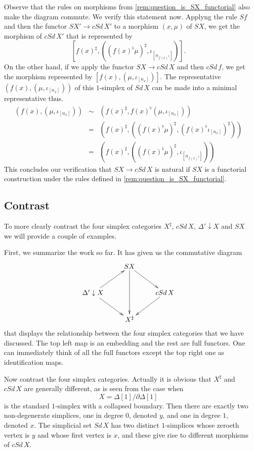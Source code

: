 \begin{remark}
Observe that the rules on morphisms from \cref{rem:question_is_SX_functorial} also make the diagram commute. We verify this statement now. Applyng the rule $Sf$ and then the functor $SX'\to cSd\, X'$ to a morphism $(x,\mu )$ of $SX$, we get the morphism of $cSd\, X'$ that is represented by
\[[f(x)^\sharp ,((f(x)^\flat \mu )^\sharp ,\iota _{[n_{f(x)^\sharp }]})].\]
On the other hand, if we apply the functor $SX\to cSd\, X$ and then $cSd\, f$, we get the morphism represented by $[f(x),(\mu ,\iota _{[n_x]})]$. The representative $(f(x),(\mu ,\iota _{[n_x]}))$ of this $1$-simplex of $Sd\, X$ can be made into a minimal representative thus.
\begin{displaymath}
\begin{array}{rcl}
(f(x),(\mu ,\iota _{[n_x]})) & \sim & (f(x)^\sharp ,f(x)^\flat (\mu ,\iota _{[n_x]})) \\
& = & (f(x)^\sharp ,((f(x)^\flat \mu )^\sharp ,(f(x)^\flat\iota _{[n_x]})^\sharp )) \\
& = & (f(x)^\sharp ,((f(x)^\flat \mu )^\sharp ,\iota _{[n_{f(x)^\sharp }]}))
\end{array}
\end{displaymath}
This concludes our verification that $SX\to cSd\, X$ is natural if $SX$ is a functorial construction under the rules defined in \cref{rem:question_is_SX_functorial}.
\end{remark}


\subsection{Contrast}

To more clearly contrast the four simplex categories $X^\sharp$, $cSd\, X$, $\Delta '\downarrow X$ and $SX$ we will provide a couple of examples.

First, we summarize the work so far. It has given us the commutative diagram
\begin{displaymath}
\xymatrix{
& SX \ar[dd] \ar[dr] \\
\Delta '\downarrow X \ar[dr] \ar[ur] && cSd\, X \ar[ld] \\
& X^\sharp
}
\end{displaymath}
that displays the relationship between the four simplex categories that we have discussed. The top left map is an embedding and the rest are full functors. One can immediately think of all the full functors except the top right one as identification maps.

Now contrast the four simplex categories. Actually it is obvious that $X^\sharp$ and $cSd\, X$ are generally different, as is seen from the case when
\[X=\Delta [1]/\partial \Delta [1]\]
is the standard $1$-simplex with a collapsed boundary. Then there are exactly two non-degenerate simplices, one in degree $0$, denoted $y$, and one in degree $1$, denoted $x$. The simplicial set $Sd\, X$ has two distinct $1$-simplices whose zeroeth vertex is $y$ and whose first vertex is $x$, and these give rise to different morphisms of $cSd\, X$.


